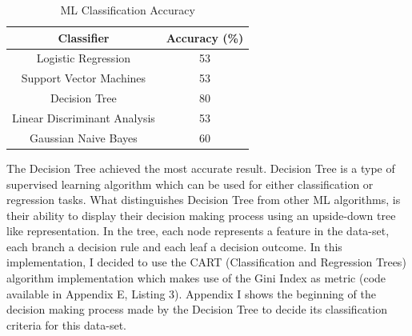 {
\begin{table}[h!]
\centering
\begin{tabular}{|c|c|}
\hline
Classifier &Accuracy (\%) \\
\hline
Logistic Regression & 53  \\
Support Vector Machines & 53  \\
Decision Tree & 80  \\
Linear Discriminant Analysis & 53 \\
Gaussian Naive Bayes & 60 \\
\hline
\end{tabular}
\caption{ML Classification Accuracy}
\label{table:1}
\end{table}
}


The Decision Tree achieved the most accurate result. Decision Tree is a type of supervised learning algorithm which can be used for either classification or regression tasks. What distinguishes Decision Tree from other ML algorithms, is their ability to display their decision making process using an upside-down tree like representation. In the tree, each node represents a feature in the data-set, each branch a decision rule and each leaf a decision outcome. In this implementation, I decided to use the CART (Classification and Regression Trees) algorithm implementation which makes use of the Gini Index as metric (code available in Appendix E, Listing 3). Appendix I shows the beginning of the decision making process made by the Decision Tree to decide its classification criteria for this data-set.



